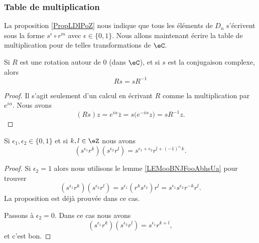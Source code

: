 \subsubsection{Table de multiplication}

La proposition \ref{PropLDIPoZ} nous indique que tous les éléments de \( D_n\) s'écrivent sous la forme \( s^{\epsilon}\circ r^m\) avec \( \epsilon\in\{ 0,1 \}\). Nous allons maintenant écrire la table de multiplication pour de telles transformations de \( \eC\).

\begin{lemma}       \label{LEMooBNJFooAbhsUa}
	Si \( R\) est une rotation autour de \( 0\) (dans \( \eC\)), et si \( s\) est la conjugaison complexe, alors
	\begin{equation}
		Rs=sR^{-1}
	\end{equation}
\end{lemma}

\begin{proof}
	Il s'agit seulement d'un calcul en écrivant \( R\) comme la multiplication par \(  e^{i\alpha}\). Nous avons
	\begin{equation}
		(Rs)z= e^{i\alpha}\bar z=s\big(  e^{-i\alpha}z \big)=sR^{-1}z.
	\end{equation}
\end{proof}

\begin{proposition}     \label{PROPooPYDLooLgiUjk}
	Si \( \epsilon_1,\epsilon_2\in\{ 0,1 \}\) et si \( k,l\in \eZ\) nous avons
	\begin{equation}
		(s^{\epsilon_1}r^k)(s^{\epsilon_2}r^l)=s^{\epsilon_1+\epsilon_2}r^{l+(-1)^{\epsilon_1}k}.
	\end{equation}
\end{proposition}

\begin{proof}
	Si \( \epsilon_2=1\) alors nous utilisons le lemme \ref{LEMooBNJFooAbhsUa} pour trouver
	\begin{equation}
		(s^{\epsilon_1}r^k)(s^{\epsilon_2}r^l)=s^{\epsilon_1}(r^ks^{\epsilon_2})r^l=s^{\epsilon_1}s^{\epsilon_2}r^{-k}r^l.
	\end{equation}
	La proposition est déjà prouvée dans ce cas.

	Passons à \( \epsilon_2=0\). Dans ce cas nous avons
	\begin{equation}
		(s^{\epsilon_1}r^k)(s^{\epsilon_2}r^l)=s^{\epsilon_1}r^{k+l},
	\end{equation}
	et c'est bon.
\end{proof}

